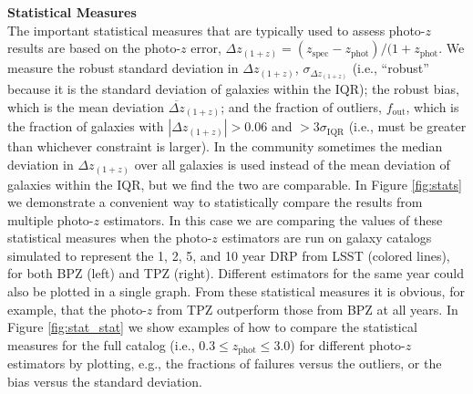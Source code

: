 \documentclass[DM,lsstdraft,toc]{lsstdoc}
\begin{document}
\smallskip \noindent \textbf{Statistical Measures} \\
The important statistical measures that are typically used to assess photo-$z$ results are based on the photo-$z$ error, $\Delta z_{(1+z)} = (z_\mathrm{spec}-z_\mathrm{phot})/(1+z_\mathrm{phot}$. We measure the robust standard deviation in $\Delta z_{(1+z)}$, $\sigma_{\Delta z_{(1+z)}}$ (i.e., ``robust'' because it is the standard deviation of galaxies within the IQR); the robust bias, which is the mean deviation $\overline{\Delta z}_{(1+z)}$; and the fraction of outliers, $f_\mathrm{out}$, which is the fraction of galaxies with $|\Delta z_{(1+z)}|> 0.06$ and $>3\sigma_\mathrm{IQR}$ (i.e., must be greater than whichever constraint is larger). In the community sometimes the median deviation in $\Delta z_{(1+z)}$ over all galaxies is used instead of the mean deviation of galaxies within the IQR, but we find the two are comparable. In Figure \ref{fig:stats} we demonstrate a convenient way to statistically compare the results from multiple photo-$z$ estimators. In this case we are comparing the values of these statistical measures when the photo-$z$ estimators are run on galaxy catalogs simulated to represent the 1, 2, 5, and 10 year DRP from LSST (colored lines), for both BPZ (left) and TPZ (right). Different estimators for the same year could also be plotted in a single graph. From these statistical measures it is obvious, for example, that the photo-$z$ from TPZ outperform those from BPZ at all years. In Figure \ref{fig:stat_stat} we show examples of how to compare the statistical measures for the full catalog (i.e., $0.3 \leq z_\mathrm{phot} \leq 3.0$) for different photo-$z$ estimators by plotting, e.g., the fractions of failures versus the outliers, or the bias versus the standard deviation.
\end{document}
